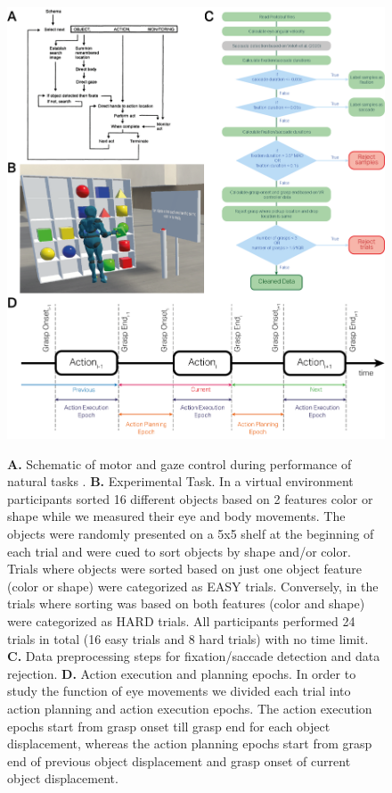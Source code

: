 \begin{figure}[H]
    \centering
    \includegraphics[width=1\linewidth]{source/figures/experiment_setup/Methods_1.png} \\
    \caption[]{\textbf{A.} Schematic of motor and gaze control during performance of natural tasks \citet{Land2001-do}. \textbf{B.} Experimental Task. In a virtual environment participants sorted 16 different objects based on 2 features color or shape while we measured their eye and body movements. The objects were randomly presented on a 5x5 shelf at the beginning of each trial and were cued to sort objects by shape and/or color. Trials where objects were sorted based on just one object feature (color or shape) were categorized as EASY trials. Conversely, in the trials where sorting was based on both features (color and shape) were categorized as HARD trials. All participants performed 24 trials in total (16 easy trials and 8 hard trials) with no time limit. \textbf{C.} Data preprocessing steps for fixation/saccade detection and data rejection. \textbf{D.} Action execution and planning epochs. In order to study the function of eye movements we divided each trial into action planning and action execution epochs. The action execution epochs start from grasp onset till grasp end for each object displacement, whereas the action planning epochs start from grasp end of previous object displacement and grasp onset of current object displacement.}
    \label{figure:task}
\end{figure}

